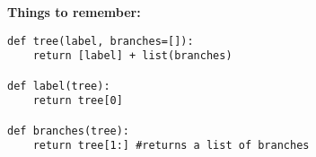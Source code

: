 \textbf{Things to remember:}

\begin{lstlisting}
def tree(label, branches=[]):
    return [label] + list(branches)

def label(tree):
    return tree[0] 

def branches(tree):
    return tree[1:] #returns a list of branches
		
\end{lstlisting}

